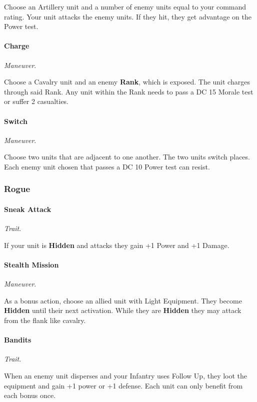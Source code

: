 \documentclass[letterpaper,twocolumn,openany,nodeprecatedcode]{dndbook}
\begin{document}
Choose an Artillery unit and a number of enemy units equal to your command rating.
Your unit attacks the enemy units.
If they hit, they get advantage on the Power test.

\paragraph{Charge}
\textit{Maneuver}.

Choose a Cavalry unit and an enemy \textbf{Rank}, which is exposed.
The unit charges through said Rank.
Any unit within the Rank needs to pass a DC 15 Morale test or suffer 2 casualties.

\paragraph{Switch}
\textit{Maneuver}.

Choose two units that are adjacent to one another.
The two units switch places.
Each enemy unit chosen that passes a DC 10 Power test can resist.

\subsubsection{Rogue}

\paragraph{Sneak Attack}
\textit{Trait}.

If your unit is \textbf{Hidden} and attacks they gain +1 Power and +1 Damage.

\paragraph{Stealth Mission}
\textit{Maneuver}.

As a bonus action, choose an allied unit with Light Equipment.
They become \textbf{Hidden} until their next activation.
While they are \textbf{Hidden} they may attack from the flank like cavalry.

\paragraph{Bandits}
\textit{Trait}.

When an enemy unit disperses and your Infantry uses Follow Up,
they loot the equipment and gain +1 power or +1 defense.
Each unit can only benefit from each bonus once.
\end{document}
